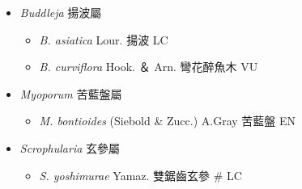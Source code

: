 
  \begin{itemize}
 \item[] \textit{Buddleja} 揚波屬
                                
  \begin{itemize}
        \item[] \textit{B. asiatica} Lour.  揚波   LC
        \item[] \textit{B. curviflora} Hook. ＆ Arn.  彎花醉魚木   VU
  \end{itemize}
 \item[] \textit{Myoporum} 苦藍盤屬
                                
  \begin{itemize}
        \item[] \textit{M. bontioides} (Siebold \& Zucc.) A.Gray  苦藍盤   EN
  \end{itemize}
 \item[] \textit{Scrophularia} 玄參屬
                                
  \begin{itemize}
        \item[] \textit{S. yoshimurae} Yamaz.  雙鋸齒玄參  \# LC
  \end{itemize}
  \end{itemize}
